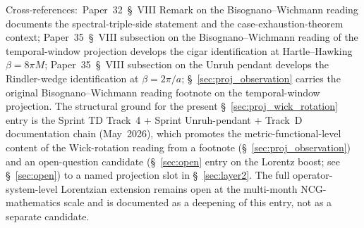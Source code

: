 \documentclass[11pt]{article}
\begin{document}
Cross-references:\ Paper~32~\S~VIII Remark on the Bisognano--Wichmann
reading documents the spectral-triple-side statement and the
case-exhaustion-theorem context; Paper~35~\S~VIII subsection on the
Bisognano--Wichmann reading of the temporal-window projection
develops the cigar identification at Hartle--Hawking
$\beta = 8\pi M$; Paper~35~\S~VIII subsection on the Unruh pendant
develops the Rindler-wedge identification at $\beta = 2\pi / a$;
\S~\ref{sec:proj_observation} carries the original
Bisognano--Wichmann reading footnote on the temporal-window
projection.  The structural ground for the present \S~\ref{sec:proj_wick_rotation}
entry is the Sprint TD Track~4 + Sprint Unruh-pendant + Track~D
documentation chain (May~2026), which promotes the metric-functional-level
content of the Wick-rotation reading from a footnote (\S~\ref{sec:proj_observation})
and an open-question candidate (\S~\ref{sec:open} entry
on the Lorentz boost; see \S~\ref{sec:open}) to a named projection
slot in \S~\ref{sec:layer2}.  The full operator-system-level
Lorentzian extension remains open at the multi-month NCG-mathematics
scale and is documented as a deepening of this entry, not as a
separate candidate.
\end{document}
